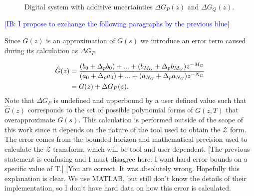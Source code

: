 \documentclass{sig-alternate-05-2015}
\newcommand{\red}[1]{{\color{red}#1}}
\newcommand{\green}[1]{{\color{green}#1}}
\begin{document}
\begin{figure}[ht]
{
}
 \caption{Digital system with additive uncertainties $\Delta G_{P}(z)$ and $\Delta G_{Q}(z)$. \label{fig:digsystem2}}
\end{figure}

\textcolor{blue}{[IB: I propose to exchange the following paragraphs by the previous blue]}


Since $G(z)$ is an approximation of $G(s)$ we introduce an error term caused during its calculation as $\Delta{G}_P$

%
\begin{align}
\small
\label{parametric_plant_tf}
\hat{G}(z)&=\frac{(b_{0}+\Delta_p b_{0}) +...+(b_{M_G}+\Delta_p b_{M_G})z^{-M_G}}{(a_{0}+\Delta_p a_{0})+...+(a_{N_G}+\Delta_p a_{N_G})z^{-N_G}} \nonumber \\
&=G(z)+\Delta{G}_P(z).
\end{align}
%
Note that $\Delta{G}_P$ is undefined and upperbound by a user defined
value such that $\hat{G}(z)$ corresponds to the set of
possible polynomial forms of $G(z, T)$ that overapproximate $G(s)$.
This calculation is performed outside of the scope of this work since it depends on the nature of the tool used to obtain the $\mathcal{Z}$ form. The error comes from the bounded horizon and mathematical precision used to calculate the $\mathcal{Z}$ transform, which will be tool and user dependent.
\red{[The previous statement is confusing and I must disagree here: I want hard error bounds on a specific value of T.]}
\green{[You are correct. It was absolutely wrong. Hopefully this explanation is clear. We use MATLAB, but still don't know the details of their implementation, so I don't have hard data on how this error is calculated.}
\end{document}
